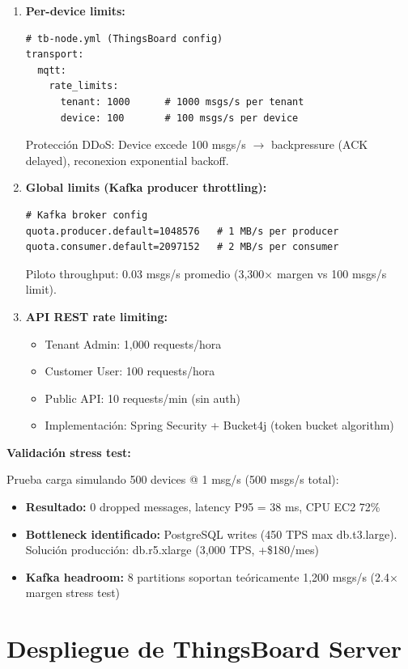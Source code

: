 \begin{enumerate}
    \item \textbf{Per-device limits:}
    \begin{verbatim}
# tb-node.yml (ThingsBoard config)
transport:
  mqtt:
    rate_limits:
      tenant: 1000      # 1000 msgs/s per tenant
      device: 100       # 100 msgs/s per device
    \end{verbatim}
    Protección DDoS: Device excede 100 msgs/s $\rightarrow$ backpressure (ACK delayed), reconexion exponential backoff.
    
    \item \textbf{Global limits (Kafka producer throttling):}
    \begin{verbatim}
# Kafka broker config
quota.producer.default=1048576   # 1 MB/s per producer
quota.consumer.default=2097152   # 2 MB/s per consumer
    \end{verbatim}
    Piloto throughput: 0.03 msgs/s promedio (3,300$\times$ margen vs 100 msgs/s limit).
    
    \item \textbf{API REST rate limiting:}
    \begin{itemize}
        \item Tenant Admin: 1,000 requests/hora
        \item Customer User: 100 requests/hora
        \item Public API: 10 requests/min (sin auth)
        \item Implementación: Spring Security + Bucket4j (token bucket algorithm)
    \end{itemize}
\end{enumerate}

\textbf{Validación stress test:}

Prueba carga simulando 500 devices @ 1 msg/s (500 msgs/s total):
\begin{itemize}
    \item \textbf{Resultado:} 0 dropped messages, latency P95 = 38 ms, CPU EC2 72\%
    \item \textbf{Bottleneck identificado:} PostgreSQL writes (450 TPS max db.t3.large). Solución producción: db.r5.xlarge (3,000 TPS, +\$180/mes)
    \item \textbf{Kafka headroom:} 8 partitions soportan teóricamente 1,200 msgs/s (2.4$\times$ margen stress test)
\end{itemize}

\section{Despliegue de ThingsBoard Server}
\label{sec:server-tb-server}

